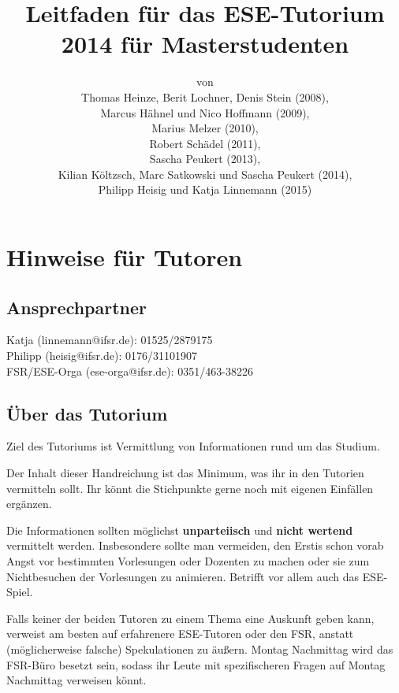 \documentclass[a4paper,12pt]{report}
\begin{document}
\title{\textbf{Leitfaden für das ESE-Tutorium 2014 für Masterstudenten}\\}
\date{}
\author{von\\Thomas Heinze, Berit Lochner, Denis Stein (2008), \\Marcus Hähnel und Nico Hoffmann (2009), \\Marius Melzer (2010), \\Robert Schädel (2011),\\Sascha Peukert (2013), \\Kilian Költzsch, Marc Satkowski und Sascha Peukert (2014), \\Philipp Heisig und Katja Linnemann (2015)}
\maketitle

\chapter{Hinweise für Tutoren}
\section{Ansprechpartner}
Katja (linnemann@ifsr.de): 01525/2879175\\
Philipp (heisig@ifsr.de): 0176/31101907 \\
FSR/ESE-Orga (ese-orga@ifsr.de): 0351/463-38226

\section{Über das Tutorium}
\begin{itemize*}
\item Ziel des Tutoriums ist Vermittlung von Informationen rund um das Studium.
\item Der Inhalt dieser Handreichung ist das Minimum, was ihr in den Tutorien vermitteln sollt.
Ihr könnt die Stichpunkte gerne noch mit eigenen Einfällen ergänzen.
\item Die Informationen sollten möglichst \textbf{unparteiisch} und \textbf{nicht wertend} vermittelt werden.
Insbesondere sollte man vermeiden, den Erstis schon vorab Angst vor bestimmten Vorlesungen oder Dozenten zu machen oder sie zum Nichtbesuchen der Vorlesungen zu animieren.
Betrifft vor allem auch das ESE-Spiel.
\item Falls keiner der beiden Tutoren zu einem Thema eine Auskunft geben kann, verweist am besten auf erfahrenere ESE-Tutoren oder den FSR, anstatt (möglicherweise falsche) Spekulationen zu äußern.
Montag Nachmittag wird das FSR-Büro besetzt sein, sodass ihr Leute mit spezifischeren Fragen auf Montag Nachmittag verweisen könnt.
\end{itemize*}
\end{document}
